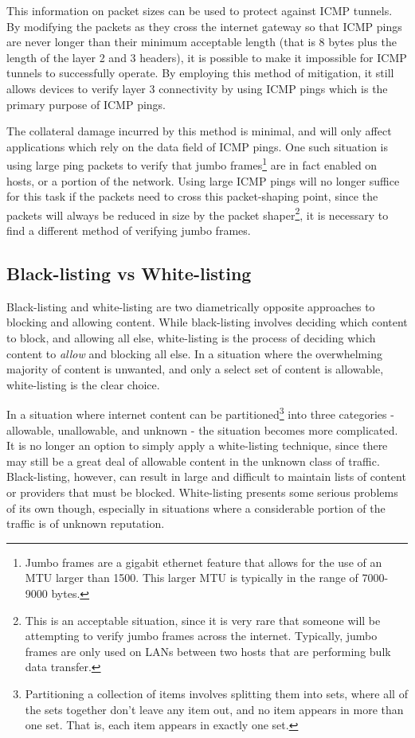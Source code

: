 \documentclass{article}
\theoremstyle{remark}
\theoremstyle{definition}
\theoremstyle{definition}
\theoremstyle{definition}
\begin{document}
This information on packet sizes can be used to protect against ICMP tunnels. By modifying the packets as they cross the internet gateway so that ICMP pings are never longer than their minimum acceptable length (that is 8 bytes plus the length of the layer 2 and 3 headers), it is possible to make it impossible for ICMP tunnels to successfully operate. By employing this method of mitigation, it still allows devices to verify layer 3 connectivity by using ICMP pings which is the primary purpose of ICMP pings.

The collateral damage incurred by this method is minimal, and will only affect applications which rely on the data field of ICMP pings. One such situation is using large ping packets to verify that jumbo frames\footnote{Jumbo frames are a gigabit ethernet feature that allows for the use of an MTU larger than 1500. This larger MTU is typically in the range of 7000-9000 bytes.} are in fact enabled on hosts, or a portion of the network. Using large ICMP pings will no longer suffice for this task if the packets need to cross this packet-shaping point, since the packets will always be reduced in size by the packet shaper\footnote{This is an acceptable situation, since it is very rare that someone will be attempting to verify jumbo frames across the internet. Typically, jumbo frames are only used on LANs between two hosts that are performing bulk data transfer.}, it is necessary to find a different method of verifying jumbo frames.

\subsection{Black-listing vs White-listing}
Black-listing and white-listing are two diametrically opposite approaches to blocking and allowing content. While black-listing involves deciding which content to block, and allowing all else, white-listing is the process of deciding which content to \emph{allow} and blocking all else. In a situation where the overwhelming majority of content is unwanted, and only a select set of content is allowable, white-listing is the clear choice.

In a situation where internet content can be partitioned\footnote{Partitioning a collection of items involves splitting them into sets, where all of the sets together don't leave any item out, and no item appears in more than one set. That is, each item appears in exactly one set.}  into three categories - allowable, unallowable, and unknown - the situation becomes more complicated. It is no longer an option to simply apply a white-listing technique, since there may still be a great deal of allowable content in the unknown class of traffic. Black-listing, however, can result in large and difficult to maintain lists of content or providers that must be blocked. White-listing presents some serious problems of its own though, especially in situations where a considerable portion of the traffic is of unknown reputation.
\end{document}
